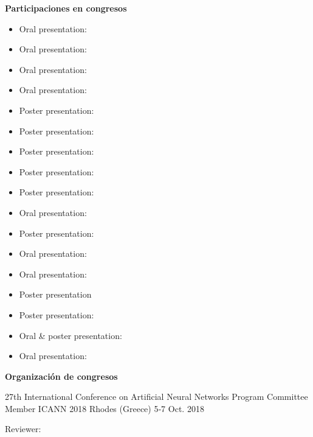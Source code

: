 \textbf{Participaciones en congresos}
% 
\begin{itemize}
 \item Oral presentation: 
 \item Oral presentation: 
 \item Oral presentation: 
 \item Oral presentation: 
 \item Poster presentation:  
 \item Poster presentation:  
 \item Poster presentation: 
 \item Poster presentation: 
 \item Poster presentation: 
 \item Oral presentation:  
 \item Poster presentation: 
 \item Oral presentation: 
 \item Oral presentation:  
 \item Poster presentation
 \item Poster presentation: 
 \item Oral \& poster presentation: 
 \item Oral presentation: 
\end{itemize}

\textbf{Organización de congresos}
\begin{cventries}
  \cventry
    {27th International Conference on Artificial Neural Networks}
    {Program Committee Member ICANN 2018}
    {Rhodes (Greece)}
    {5‐7 Oct. 2018}
	{\begin{cvitems}
			\item Reviewer: 
	 \end{cvitems}	
	}
\end{cventries}

